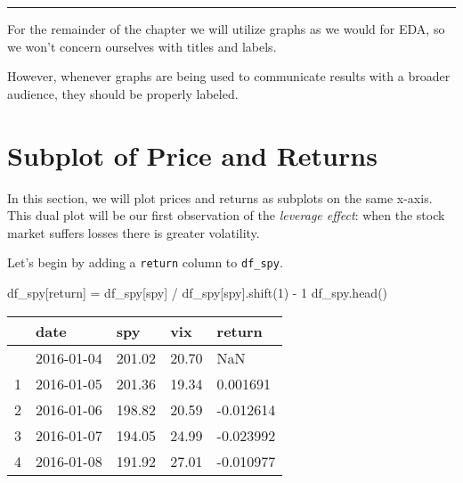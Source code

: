 \documentclass[
  letterpaper,
  DIV=11,
  numbers=noendperiod]{scrreprt}
\newenvironment{Shaded}{\begin{snugshade}}{\end{snugshade}}
\newcommand{\DecValTok}[1]{\textcolor[rgb]{0.68,0.00,0.00}{#1}}
\newcommand{\NormalTok}[1]{\textcolor[rgb]{0.00,0.23,0.31}{#1}}
\newcommand{\OperatorTok}[1]{\textcolor[rgb]{0.37,0.37,0.37}{#1}}
\newcommand{\StringTok}[1]{\textcolor[rgb]{0.13,0.47,0.30}{#1}}
\begin{document}
\begin{center}\rule{0.5\linewidth}{0.5pt}\end{center}

For the remainder of the chapter we will utilize graphs as we would for
EDA, so we won't concern ourselves with titles and labels.

However, whenever graphs are being used to communicate results with a
broader audience, they should be properly labeled.

\hypertarget{subplot-of-price-and-returns}{%
\section{Subplot of Price and
Returns}\label{subplot-of-price-and-returns}}

In this section, we will plot prices and returns as subplots on the same
x-axis. This dual plot will be our first observation of the
\emph{leverage effect}: when the stock market suffers losses there is
greater volatility.

Let's begin by adding a \texttt{return} column to \texttt{df\_spy}.

\begin{Shaded}
\begin{Highlighting}[]
\NormalTok{df\_spy[}\StringTok{\textquotesingle{}return\textquotesingle{}}\NormalTok{] }\OperatorTok{=}\NormalTok{ df\_spy[}\StringTok{\textquotesingle{}spy\textquotesingle{}}\NormalTok{] }\OperatorTok{/}\NormalTok{ df\_spy[}\StringTok{\textquotesingle{}spy\textquotesingle{}}\NormalTok{].shift(}\DecValTok{1}\NormalTok{) }\OperatorTok{{-}} \DecValTok{1}
\NormalTok{df\_spy.head()}
\end{Highlighting}
\end{Shaded}

\begin{longtable}[]{@{}lllll@{}}
\toprule\noalign{}
& date & spy & vix & return \\
\midrule\noalign{}
\endhead
\bottomrule\noalign{}
\endlastfoot
0 & 2016-01-04 & 201.02 & 20.70 & NaN \\
1 & 2016-01-05 & 201.36 & 19.34 & 0.001691 \\
2 & 2016-01-06 & 198.82 & 20.59 & -0.012614 \\
3 & 2016-01-07 & 194.05 & 24.99 & -0.023992 \\
4 & 2016-01-08 & 191.92 & 27.01 & -0.010977 \\
\end{longtable}
\end{document}
